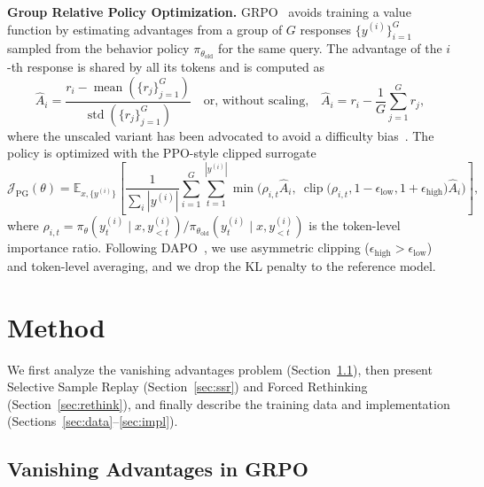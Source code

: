 \documentclass{article}
\begin{document}
\textbf{Group Relative Policy Optimization.} GRPO~\cite{deepseek-r1} avoids training a value function by estimating advantages from a group of $G$ responses $\{y^{(i)}\}_{i=1}^{G}$ sampled from the behavior policy $\pi_{\theta_\text{old}}$ for the same query. The advantage of the $i$-th response is shared by all its tokens and is computed as
\begin{equation}
    \hat{A}_i = \frac{r_i - \operatorname{mean}(\{r_j\}_{j=1}^{G})}{\operatorname{std}(\{r_j\}_{j=1}^{G})} \quad \text{or, without scaling,} \quad \hat{A}_i = r_i - \frac{1}{G}\sum_{j=1}^{G} r_j,
    \label{eq:adv}
\end{equation}
where the unscaled variant has been advocated to avoid a difficulty bias~\cite{drgrpo}. The policy is optimized with the PPO-style clipped surrogate~\cite{ppo}
\begin{equation}
    \mathcal{J}_\text{PG}(\theta) = \mathbb{E}_{x,\{y^{(i)}\}}\left[\frac{1}{\sum_i |y^{(i)}|}\sum_{i=1}^{G}\sum_{t=1}^{|y^{(i)}|} \min\Big(\rho_{i,t}\hat{A}_i,\ \operatorname{clip}\big(\rho_{i,t}, 1-\epsilon_\text{low}, 1+\epsilon_\text{high}\big)\hat{A}_i\Big)\right],
    \label{eq:pg}
\end{equation}
where $\rho_{i,t} = \pi_\theta(y^{(i)}_t\mid x, y^{(i)}_{<t}) / \pi_{\theta_\text{old}}(y^{(i)}_t\mid x, y^{(i)}_{<t})$ is the token-level importance ratio. Following DAPO~\cite{dapo}, we use asymmetric clipping ($\epsilon_\text{high}>\epsilon_\text{low}$) and token-level averaging, and we drop the KL penalty to the reference model.

\section{Method}
\label{sec:method}

We first analyze the vanishing advantages problem (Section~\ref{sec:vanish}), then present Selective Sample Replay (Section~\ref{sec:ssr}) and Forced Rethinking (Section~\ref{sec:rethink}), and finally describe the training data and implementation (Sections~\ref{sec:data}--\ref{sec:impl}).

\subsection{Vanishing Advantages in GRPO}
\label{sec:vanish}
\end{document}
